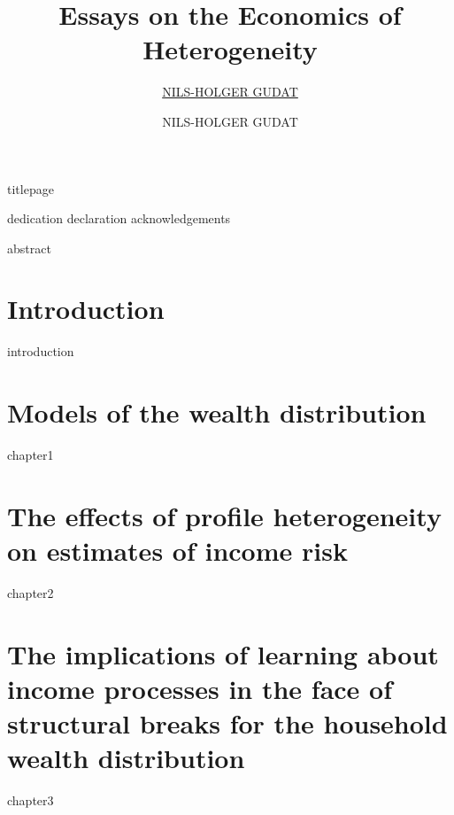 \documentclass[oneside,12pt,a4paper]{Classes/CUEDthesisPSnPDF}
\title{Essays on the Economics of Heterogeneity}
\author{\href{}{NILS-HOLGER GUDAT}}
\author{NILS-HOLGER GUDAT}
\begin{document}
{titlepage}

{dedication}
{declaration}
{acknowledgements}

\begin{abstractslong}
{abstract}
\end{abstractslong}

\setcounter{secnumdepth}{2} %
\setcounter{tocdepth}{1}

\begin{spacing}{1.3}
  \tableofcontents
\end{spacing}

\begin{spacing}{1.5}
	\listoftables
	\listoffigures
\end{spacing}

\chapter{Introduction} %
{introduction}

\chapter{Models of the wealth distribution} %
{chapter1}

\chapter{The effects of profile heterogeneity on estimates of income risk} 
{chapter2}

\chapter{The implications of learning about income processes in the face of structural breaks for the household wealth distribution} 
{chapter3}
\end{document}
